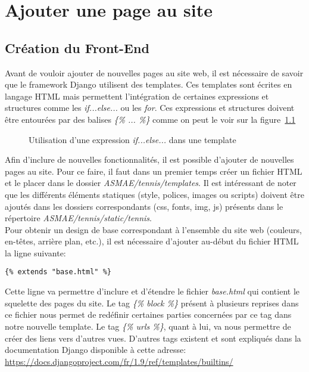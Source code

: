 \chapter{Ajouter une page au site}

\section{Création du Front-End}

Avant de vouloir ajouter de nouvelles pages au site web, il est nécessaire de savoir que le framework Django utilisent des templates. Ces templates sont écrites en langage HTML mais permettent l'intégration de certaines expressions et structures comme les \textit{if...else...} ou les \textit{for}. Ces expressions et structures doivent être entourées par des balises \textit{\{\% ... \%\}} comme on peut le voir sur la figure~\ref{fig:Utilisation d'une expression if...else... dans une template}\\

\begin{figure}[!ht]
\centering
\begin{framed}

\end{framed}
\caption{Utilisation d'une expression \textit{if...else...} dans une template}
\label{fig:Utilisation d'une expression if...else... dans une template}
\end{figure}
\FloatBarrier

Afin d'inclure de nouvelles fonctionnalités, il est possible d'ajouter de nouvelles pages au site. Pour ce faire, il faut dans un premier temps créer un fichier HTML et le placer dans le dossier \textit{ASMAE/tennis/templates}. Il est intéressant de noter que les différents éléments statiques (style, polices, images ou scripts) doivent être ajoutés dans les dossiers correspondants (css, fonts, img, js)  présents dans le répertoire \textit{ASMAE/tennis/static/tennis}.\\

Pour obtenir un design de base correspondant à l'ensemble du site web (couleurs, en-têtes, arrière plan, etc.), il est nécessaire d'ajouter au-début du fichier HTML la ligne suivante:

\begin{verbatim}
{% extends "base.html" %}
\end{verbatim}

Cette ligne va permettre d'inclure et d'étendre le fichier \textit{base.html} qui contient le squelette des pages du site. Le tag \textit{\{\% block \%\}} présent à plusieurs reprises dans ce fichier nous permet de redéfinir certaines parties concernées par ce tag dans notre nouvelle template. Le tag \textit{\{\% urls \%\}}, quant à lui, va nous permettre de créer des liens vers d'autres vues. D'autres tags existent et sont expliqués dans la documentation Django disponible à cette adresse: \url{https://docs.djangoproject.com/fr/1.9/ref/templates/builtins/}


